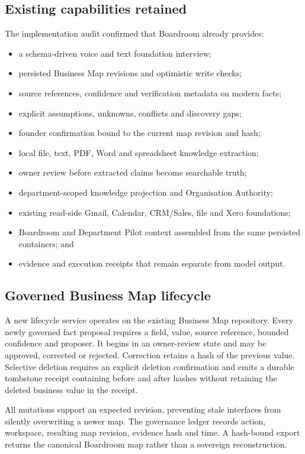 \subsection{Existing capabilities retained}

The implementation audit confirmed that Boardroom already provides:

\begin{itemize}
  \item a schema-driven voice and text foundation interview;
  \item persisted Business Map revisions and optimistic write checks;
  \item source references, confidence and verification metadata on modern facts;
  \item explicit assumptions, unknowns, conflicts and discovery gaps;
  \item founder confirmation bound to the current map revision and hash;
  \item local file, text, PDF, Word and spreadsheet knowledge extraction;
  \item owner review before extracted claims become searchable truth;
  \item department-scoped knowledge projection and Organisation Authority;
  \item existing read-side Gmail, Calendar, CRM/Sales, file and Xero foundations;
  \item Boardroom and Department Pilot context assembled from the same persisted
  containers; and
  \item evidence and execution receipts that remain separate from model output.
\end{itemize}

\subsection{Governed Business Map lifecycle}

A new lifecycle service operates on the existing Business Map repository.
Every newly governed fact proposal requires a field, value, source reference,
bounded confidence and proposer.  It begins in an owner-review state and may be
approved, corrected or rejected.  Correction retains a hash of the previous
value.  Selective deletion requires an explicit deletion confirmation and emits
a durable tombstone receipt containing before and after hashes without retaining
the deleted business value in the receipt.

All mutations support an expected revision, preventing stale interfaces from
silently overwriting a newer map.  The governance ledger records action,
workspace, resulting map revision, evidence hash and time.  A hash-bound export
returns the canonical Boardroom map rather than a sovereign reconstruction.

